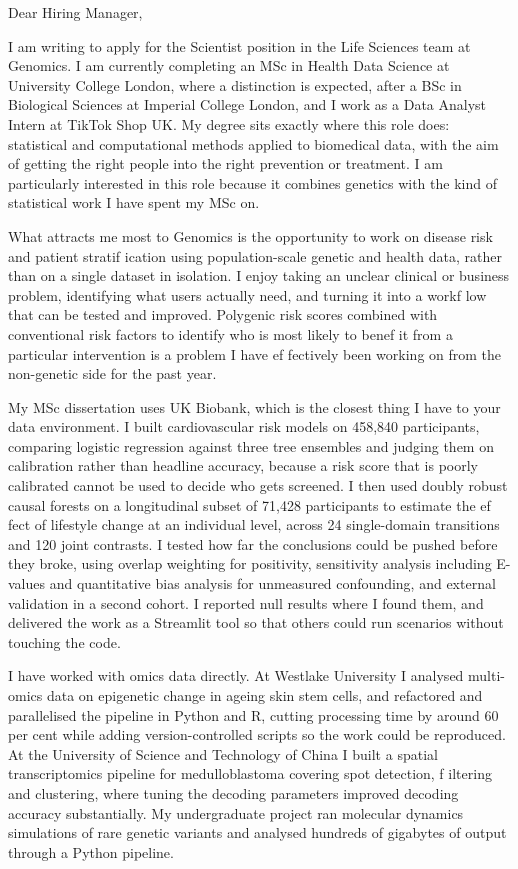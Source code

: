 \documentclass[letterpaper,11pt]{article}
\begin{document}
Dear Hiring Manager,

I am writing to apply for the Scientist position in the Life Sciences team at Genomics. I am currently completing an MSc in Health Data Science at University College London, where a distinction is expected, after a BSc in Biological Sciences at Imperial College London, and I work as a Data Analyst Intern at TikTok Shop UK. My degree sits exactly where this role does: statistical and computational methods applied to biomedical data, with the aim of getting the right people into the right prevention or treatment. I am particularly interested in this role because it combines genetics with the kind of statistical work I have spent my MSc on.

What attracts me most to Genomics is the opportunity to work on disease risk and patient stratif\kern0pt ication using population-scale genetic and health data, rather than on a single dataset in isolation. I enjoy taking an unclear clinical or business problem, identifying what users actually need, and turning it into a workf\kern0pt low that can be tested and improved. Polygenic risk scores combined with conventional risk factors to identify who is most likely to benef\kern0pt it from a particular intervention is a problem I have ef\kern0pt fectively been working on from the non-genetic side for the past year.

My MSc dissertation uses UK Biobank, which is the closest thing I have to your data environment. I built cardiovascular risk models on 458,840 participants, comparing logistic regression against three tree ensembles and judging them on calibration rather than headline accuracy, because a risk score that is poorly calibrated cannot be used to decide who gets screened. I then used doubly robust causal forests on a longitudinal subset of 71,428 participants to estimate the ef\kern0pt fect of lifestyle change at an individual level, across 24 single-domain transitions and 120 joint contrasts. I tested how far the conclusions could be pushed before they broke, using overlap weighting for positivity, sensitivity analysis including E-values and quantitative bias analysis for unmeasured confounding, and external validation in a second cohort. I reported null results where I found them, and delivered the work as a Streamlit tool so that others could run scenarios without touching the code.

I have worked with omics data directly. At Westlake University I analysed multi-omics data on epigenetic change in ageing skin stem cells, and refactored and parallelised the pipeline in Python and R, cutting processing time by around 60 per cent while adding version-controlled scripts so the work could be reproduced. At the University of Science and Technology of China I built a spatial transcriptomics pipeline for medulloblastoma covering spot detection, f\kern0pt iltering and clustering, where tuning the decoding parameters improved decoding accuracy substantially. My undergraduate project ran molecular dynamics simulations of rare genetic variants and analysed hundreds of gigabytes of output through a Python pipeline.
\end{document}

